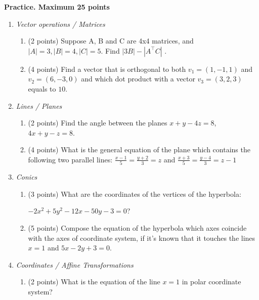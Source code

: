 \documentclass[]{exam}
\begin{document}
\begin{center}
\textbf{Practice. Maximum 25 points}    
\end{center}
\begin{enumerate}
\item \textit{Vector operations / Matrices} 
\begin{enumerate}
\item (2 points) 
Suppose A, B and C are 4x4 matrices, and $|A|=3, |B|=4,|C|=5$. Find $|3B|-|A^{\top}C|$ .

\item (4 points) 
Find a vector that is orthogonal to both $v_1= (1,-1,1)$ and $v_2=(6,-3,0)$ and which dot product with a vector $v_3=(3,2,3)$ equals to $10$.

\end{enumerate}

\item  \textit{Lines / Planes}
\begin{enumerate}
\item (2 points) 
Find the angle between the planes $x + y - 4 z = 8$, $4x + y - z = 8$.


\item (4 points) 
What is the general equation of the plane which contains the following two parallel lines:
$\frac{x-1}{5} = \frac{y+2}{3} = z $
and 
$\frac{x+3}{5} = \frac{y-4}{3} = z - 1 $

\end{enumerate}


\item \textit{Conics}
\begin{enumerate}
\item (3 points) What are the coordinates of the vertices of the hyperbola:

$-2x^2 + 5y^2 - 12x - 50y - 3=0$? 


\item (5 points) 
Compose the equation of the hyperbola which axes coincide with the axes of coordinate system, if it's known that it touches the lines $x=1$ and $5x-2y+3=0$.
\end{enumerate}

\item \textit{Coordinates / Affine Transformations}
\begin{enumerate}
\item (2 points) 
What is the equation of the line $x=1$ in polar coordinate system?


\end{enumerate}
\end{enumerate}
\end{document}
